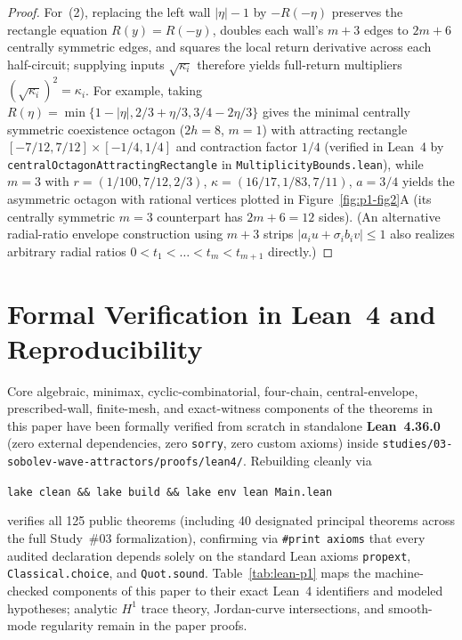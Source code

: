 \documentclass[11pt,reqno]{amsart}
\theoremstyle{definition}
\theoremstyle{remark}
\begin{document}
\begin{proof}
For~(2), replacing the left wall $|\eta| - 1$ by $-R(-\eta)$ preserves the rectangle equation $R(y) = R(-y)$, doubles each wall's $m+3$ edges to $2m + 6$ centrally symmetric edges, and squares the local return derivative across each half-circuit; supplying inputs $\sqrt{\kappa_i}$ therefore yields full-return multipliers $(\sqrt{\kappa_i})^2 = \kappa_i$. For example, taking $R(\eta) = \min\{1-|\eta|, 2/3+\eta/3, 3/4-2\eta/3\}$ gives the minimal centrally symmetric coexistence octagon ($2h = 8$, $m = 1$) with attracting rectangle $[-7/12, 7/12] \times [-1/4, 1/4]$ and contraction factor $1/4$ (verified in Lean~4 by \texttt{centralOctagonAttractingRectangle} in \texttt{MultiplicityBounds.lean}), while $m = 3$ with $r = (1/100, 7/12, 2/3)$, $\kappa = (16/17, 1/83, 7/11)$, $a = 3/4$ yields the asymmetric octagon with rational vertices plotted in Figure~\ref{fig:p1-fig2}A (its centrally symmetric $m=3$ counterpart has $2m+6 = 12$ sides). (An alternative radial-ratio envelope construction using $m+3$ strips $|a_i u + \sigma_i b_i v| \le 1$ also realizes arbitrary radial ratios $0 < t_1 < \dots < t_m < t_{m+1}$ directly.)
\end{proof}

\section{Formal Verification in Lean~4 and Reproducibility}\label{sec:lean}

Core algebraic, minimax, cyclic-combinatorial, four-chain, central-envelope, prescribed-wall, finite-mesh, and exact-witness components of the theorems in this paper have been formally verified from scratch in standalone \textbf{Lean~4.36.0} (zero external dependencies, zero \texttt{sorry}, zero custom axioms) inside \texttt{studies/03-sobolev-wave-attractors/proofs/lean4/}. Rebuilding cleanly via
\begin{center}
  \texttt{lake clean \&\& lake build \&\& lake env lean Main.lean}
\end{center}
verifies all 125 public theorems (including 40 designated principal theorems across the full Study~\#03 formalization), confirming via \texttt{\#print axioms} that every audited declaration depends solely on the standard Lean axioms \texttt{propext}, \texttt{Classical.choice}, and \texttt{Quot.sound}. Table~\ref{tab:lean-p1} maps the machine-checked components of this paper to their exact Lean~4 identifiers and modeled hypotheses; analytic $H^1$ trace theory, Jordan-curve intersections, and smooth-mode regularity remain in the paper proofs.
\end{document}

